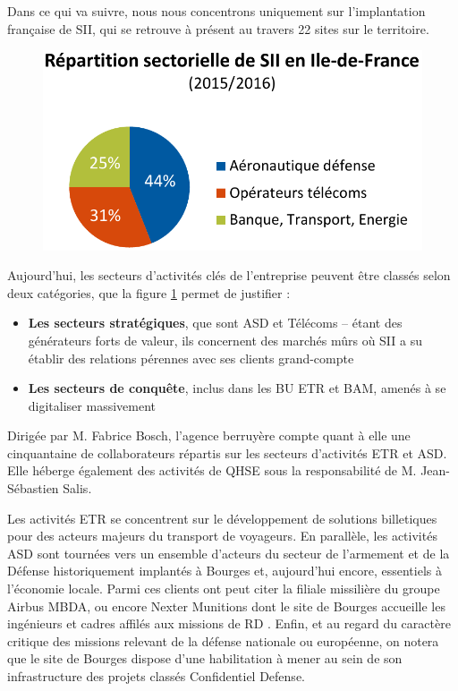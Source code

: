 Dans ce qui va suivre, nous nous concentrons uniquement sur l'implantation française de SII, qui se retrouve à présent au travers 22 sites sur le territoire.  

\begin{figure}[h]
    \centering
    \includegraphics[width=.5\linewidth]{figures/BU-IDF}
    \label{fig:Rep-sectorielle}
\end{figure}

Aujourd'hui, les secteurs d'activités clés de l'entreprise peuvent être classés selon deux catégories\cite{Bib_memento_ag_idf}, que la figure \ref{fig:Rep-sectorielle} permet de justifier : 

\begin{itemize}
  \item \textbf{Les secteurs stratégiques}, que sont \gls{ASD} et Télécoms -- étant des générateurs forts de valeur, ils concernent des marchés mûrs où SII a su établir des relations pérennes avec ses clients grand-compte
  \item \textbf{Les secteurs de conquête}, inclus dans les \gls{BU} \gls{ETR} et \gls{BAM}, amenés à se digitaliser massivement
\end{itemize}

Dirigée par M. Fabrice Bosch, l'agence berruyère compte quant à elle une cinquantaine de collaborateurs répartis sur les secteurs d'activités \gls{ETR} et \gls{ASD}. 
Elle héberge également des activités de \gls{QHSE} sous la responsabilité de M. Jean-Sébastien Salis.  

Les activités \gls{ETR} se concentrent sur le développement de solutions billetiques pour des acteurs majeurs du transport de voyageurs. 
En parallèle, les activités \gls{ASD} sont tournées vers un ensemble d'acteurs du secteur de l'armement et de la Défense historiquement implantés à Bourges et, aujourd'hui encore, essentiels à l'économie locale\cite{Bib_def_cher}. 
Parmi ces clients ont peut citer la filiale missilière du groupe Airbus MBDA, ou encore Nexter Munitions dont le site de Bourges accueille les ingénieurs et cadres affilés aux missions de \gls{RD} . 
Enfin, et au regard du caractère critique des missions relevant de la défense nationale ou européenne, on notera que le site de Bourges dispose d'une habilitation à mener au sein de son infrastructure des projets classés Confidentiel
Defense. 

